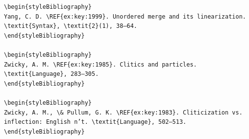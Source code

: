 \begin{verbatim}
\begin{styleBibliography}
Yang, C. D. \REF{ex:key:1999}. Unordered merge and its linearization. \textit{Syntax}, \textit{2}(1), 38–64.
\end{styleBibliography}

\begin{styleBibliography}
Zwicky, A. M. \REF{ex:key:1985}. Clitics and particles. \textit{Language}, 283–305.
\end{styleBibliography}

\begin{styleBibliography}
Zwicky, A. M., \& Pullum, G. K. \REF{ex:key:1983}. Cliticization vs. inflection: English n’t. \textit{Language}, 502–513.
\end{styleBibliography}


\end{verbatim}